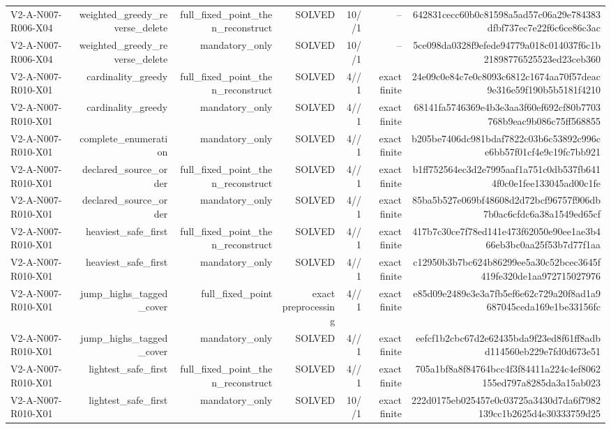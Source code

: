 {\begin{longtable}{lrrrrrr}
V2-A-N007-R006-X04 & weighted\_greedy\_reverse\_delete & full\_fixed\_point\_then\_reconstruct & SOLVED & 10//1 & -- & 642831cecc60b0c81598a5ad57c06a29e784383dfbf737ec7e22f6c6ce86c3ac \\
V2-A-N007-R006-X04 & weighted\_greedy\_reverse\_delete & mandatory\_only & SOLVED & 10//1 & -- & 5ce098da0328f9efede94779a018c014037f6c1b21898776525523ed23ceb360 \\
V2-A-N007-R010-X01 & cardinality\_greedy & full\_fixed\_point\_then\_reconstruct & SOLVED & 4//1 & exact finite & 24e09c0e84c7e0c8093c6812c1674aa70f57deac9e316e59f190b5b5181f4210 \\
V2-A-N007-R010-X01 & cardinality\_greedy & mandatory\_only & SOLVED & 4//1 & exact finite & 68141fa5746369e4b3e3aa3f60ef692cf80b7703768b9eac9b086c75ff568855 \\
V2-A-N007-R010-X01 & complete\_enumeration & mandatory\_only & SOLVED & 4//1 & exact finite & b205be7406dc981bdaf7822c03b6c53892c996ce6bb57f01cf4e9c19fc7bb921 \\
V2-A-N007-R010-X01 & declared\_source\_order & full\_fixed\_point\_then\_reconstruct & SOLVED & 4//1 & exact finite & b1ff752564ec3d2e7995aaf1a751c0db537fb6414f0c0e1fee133045ad00c1fe \\
V2-A-N007-R010-X01 & declared\_source\_order & mandatory\_only & SOLVED & 4//1 & exact finite & 85ba5b527e069bf48608d2d72bcf96757f906db7b0ac6cfdc6a38a1549ed65cf \\
V2-A-N007-R010-X01 & heaviest\_safe\_first & full\_fixed\_point\_then\_reconstruct & SOLVED & 4//1 & exact finite & 417b7c30ce7f78ed141e473f62050e90ee1ae3b466eb3bc0aa25f53b7d77f1aa \\
V2-A-N007-R010-X01 & heaviest\_safe\_first & mandatory\_only & SOLVED & 4//1 & exact finite & c12950b3b7bc624b86299ee5a30c52bcec3645f419fe320de1aa972715027976 \\
V2-A-N007-R010-X01 & jump\_highs\_tagged\_cover & full\_fixed\_point & exact preprocessing & 4//1 & exact finite & e85d09e2489e3e3a7fb5ef6e62c729a20f8ad1a9687045ceda169e1be33156fc \\
V2-A-N007-R010-X01 & jump\_highs\_tagged\_cover & mandatory\_only & SOLVED & 4//1 & exact finite & eefcf1b2cbc67d2e62435bda9f23ed8f61ff8adbd114560eb229e7fd0d673e51 \\
V2-A-N007-R010-X01 & lightest\_safe\_first & full\_fixed\_point\_then\_reconstruct & SOLVED & 4//1 & exact finite & 705a1bf8a8f84764bcc4f3f84411a224c4ef8062155ed797a8285da3a15ab023 \\
V2-A-N007-R010-X01 & lightest\_safe\_first & mandatory\_only & SOLVED & 10//1 & exact finite & 222d0175eb025457e0c03725a3430d7da6f7982139cc1b2625d4e30333759d25 \\

\end{longtable}}
